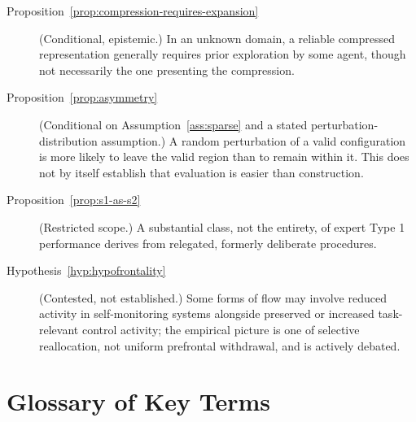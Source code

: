 \documentclass[12pt, a4paper]{article}
\theoremstyle{plain}
\theoremstyle{definition}
\theoremstyle{remark}
\begin{document}
\begin{description}
\item[Proposition~\ref{prop:compression-requires-expansion}] (Conditional, epistemic.) In an unknown domain, a reliable compressed representation generally requires prior exploration by some agent, though not necessarily the one presenting the compression.
\item[Proposition~\ref{prop:asymmetry}] (Conditional on Assumption~\ref{ass:sparse} and a stated perturbation-distribution assumption.) A random perturbation of a valid configuration is more likely to leave the valid region than to remain within it. This does not by itself establish that evaluation is easier than construction.
\item[Proposition~\ref{prop:s1-as-s2}] (Restricted scope.) A substantial class, not the entirety, of expert Type 1 performance derives from relegated, formerly deliberate procedures.
\item[Hypothesis~\ref{hyp:hypofrontality}] (Contested, not established.) Some forms of flow may involve reduced activity in self-monitoring systems alongside preserved or increased task-relevant control activity; the empirical picture is one of selective reallocation, not uniform prefrontal withdrawal, and is actively debated.
\end{description}

\section{Glossary of Key Terms}
\end{document}
